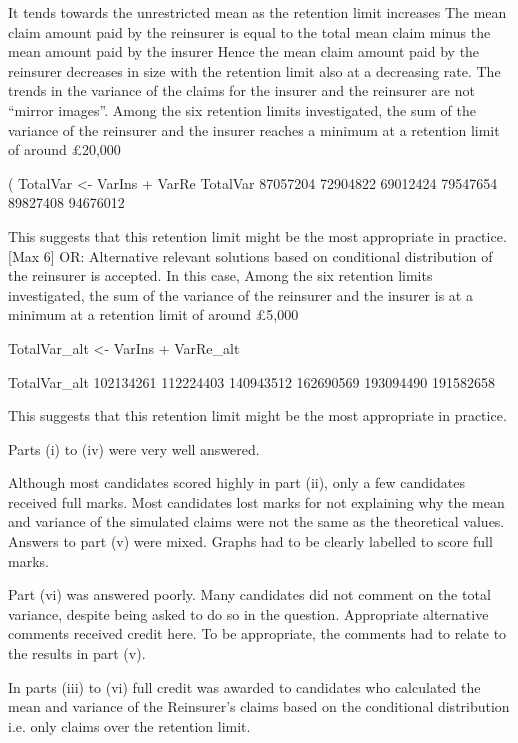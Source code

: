 \documentclass[a4paper,12pt]{article}
\begin{document}
It tends towards the unrestricted mean as the retention limit increases 
The mean claim amount paid by the reinsurer is equal to the total mean claim
minus the mean amount paid by the insurer 
Hence the mean claim amount paid by the reinsurer decreases in size with the
retention limit also at a decreasing rate. 
The trends in the variance of the claims for the insurer and the reinsurer
are not “mirror images”. 
Among the six retention limits investigated, the sum of the variance of the reinsurer
and the insurer reaches a minimum at a retention limit of around £20,000


(
TotalVar <- VarIns + VarRe
TotalVar
 87057204 72904822 69012424 79547654 89827408
94676012

This suggests that this retention limit might be the most appropriate in practice. 
[Max 6]
OR: Alternative relevant solutions based on conditional distribution of the
reinsurer is accepted. In this case,
Among the six retention limits investigated, the sum of the variance of the reinsurer
and the insurer is at a minimum at a retention limit of around £5,000


TotalVar_alt <- VarIns + VarRe_alt


TotalVar_alt
102134261 112224403 140943512 162690569 193094490
191582658

This suggests that this retention limit might be the most appropriate in practice. 
\newpage 

Parts (i) to (iv) were very well answered.

Although most candidates scored highly in part (ii), only a few candidates received full marks. Most candidates lost marks for not explaining why the mean and variance of the simulated claims were not the same as the theoretical values.
Answers to part (v) were mixed. Graphs had to be clearly labelled to score full marks.

Part (vi) was answered poorly. Many candidates did not comment on the total variance, despite being asked to do so in the question. Appropriate alternative comments received
credit here. To be appropriate, the comments had to relate to the results in part (v).

In parts (iii) to (vi) full credit was awarded to candidates who calculated the mean and variance of the Reinsurer’s claims based on the conditional distribution i.e. only claims
over the retention limit.
\end{document}
